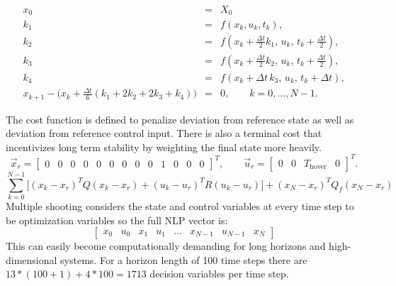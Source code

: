 \documentclass[]{article}
\begin{document}
        \begin{eqnarray}
        \nonumber
        x_0 & = & X_0 \\[6pt] \nonumber
        k_1 & = & f(x_k, u_k, t_k), \\[6pt] \nonumber
        k_2 & = & f\!\left(x_k + \tfrac{\Delta t}{2} k_1,\, u_k,\, t_k + \tfrac{\Delta t}{2}\right), \\[6pt] \nonumber
        k_3 & = & f\!\left(x_k + \tfrac{\Delta t}{2} k_2,\, u_k,\, t_k + \tfrac{\Delta t}{2}\right), \\[6pt] \nonumber
        k_4 & = & f\!\left(x_k + \Delta t\, k_3,\, u_k,\, t_k + \Delta t\right), \\[10pt]
        x_{k+1} - \Big(x_k + \tfrac{\Delta t}{6}(k_1 + 2k_2 + 2k_3 + k_4)\Big) &=& 0, 
        \qquad k = 0,\dots, N-1.
        \label{eq:rkstate}
        \end{eqnarray}
        
The cost function is defined to penalize deviation from reference state as well as deviation from reference control input. There is also a terminal cost that incentivizes long term stability by weighting the final state more heavily.
        \[
        \vec{x}_r =
        \begin{bmatrix}
        0 & 0 & 0 & 0 & 0 & 0 & 0 & 0 & 0 & 1 & 0 & 0 & 0
        \end{bmatrix}^{\!T},
        \qquad
        \vec{u}_r =
        \begin{bmatrix}
        0 & 0 & T_{\text{hover}} & 0
        \end{bmatrix}^{\!T}.
        \]
         \begin{equation}
         	 \sum_{k=0}^{N-1}  \Big[(x_k -  x_{r})^T Q (x_k - x_{r}) + (u_k -  u_{r})^T R (u_k - u_{r}) \Big] + (x_N -  x_{r})^T Q_f (x_N - x_{r})
         \end{equation}
Multiple shooting considers the state and control variables at every time step to be optimization variables so the full NLP vector is:
        \[
        \begin{bmatrix}
        x_0 & u_0 & x_1 & u_1 & ... & x_{N-1} & u_{N-1} & x_N
        \end{bmatrix}
        \]
This can easily become computationally demanding for long horizons and high-dimensional systems. For a horizon length of 100 time steps there are $13 * (100+1)+4*100=1713$ decision variables per time step.
 
\end{document}
